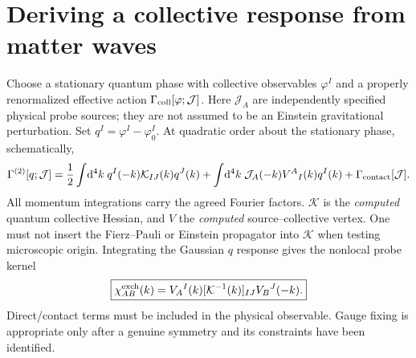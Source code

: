 \documentclass[11pt,a4paper]{article}
\theoremstyle{remark}\newtheorem{remark}[theorem]{Remark}
\newcommand{\dd}{\mathrm d}\newcommand{\Tr}{\operatorname{Tr}}\newcommand{\cO}{\mathcal O}\newcommand{\cG}{\mathcal G}\newcommand{\cH}{\mathcal H}\newcommand{\cE}{\mathcal E}\newcommand{\cK}{\mathcal K}\newcommand{\AX}{\textsf{[AXIOM]}}\newcommand{\D}{\textsf{[DERIVED]}}\newcommand{\C}{\textsf{[CONDITIONAL]}}\newcommand{\OPEN}{\textsf{[OPEN]}}
\begin{document}
\section{Deriving a collective response from matter waves}
Choose a stationary quantum phase with collective observables $\varphi^I$ and a properly renormalized effective action $\Gamma_{\rm coll}[\varphi;\mathcal J]$. Here $\mathcal J_A$ are independently specified physical probe sources; they are not assumed to be an Einstein gravitational perturbation. Set $q^I=\varphi^I-\varphi_0^I$. At quadratic order about the stationary phase, schematically,
\begin{equation}\label{eq:quadratic}
\Gamma^{(2)}[q;\mathcal J]=\frac12\int\!\dd^4k\;q^I(-k)\cK_{IJ}(k)q^J(k)
 +\int\!\dd^4k\;\mathcal J_A(-k)V^A{}_I(k)q^I(k)+\Gamma_{\rm contact}[\mathcal J].
\end{equation}
All momentum integrations carry the agreed Fourier factors. $\cK$ is the \emph{computed} quantum collective Hessian, and $V$ the \emph{computed} source--collective vertex. One must not insert the Fierz--Pauli or Einstein propagator into $\cK$ when testing microscopic origin. Integrating the Gaussian $q$ response gives the nonlocal probe kernel
\begin{equation}\label{eq:response}
\boxed{\chi_{AB}^{\rm exch}(k)=V_A{}^I(k)[\cK^{-1}(k)]_{IJ}V_B{}^J(-k).}
\end{equation}
Direct/contact terms must be included in the physical observable. Gauge fixing is appropriate only after a genuine symmetry and its constraints have been identified.
\end{document}
